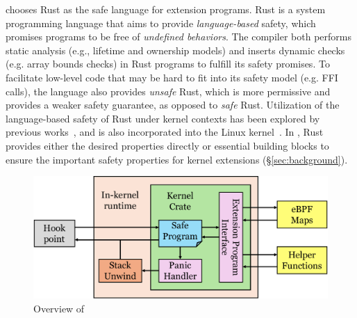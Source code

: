 
\projname{} chooses Rust as the safe language for extension programs.
Rust is a system programming language that aims to provide
    \emph{language-based} safety, which promises programs to be free of
    \emph{undefined behaviors}.
The compiler both performs static analysis (e.g., lifetime and ownership
    models) and inserts dynamic checks (e.g. array bounds checks) in
    Rust programs to fulfill its safety promises.
To facilitate low-level code that may be hard to fit into its safety model (e.g.
    FFI calls), the language also provides \emph{unsafe} Rust, which is more
    permissive and provides a weaker safety guarantee, as opposed to
    \emph{safe} Rust.
Utilization of the language-based safety of Rust under kernel contexts has been
    explored by previous works~\cite{redleaf,theseus}, and is also incorporated
    into the Linux kernel~\cite{rust-for-linux-lwn}.
In \projname{}, Rust provides either the desired properties directly or
    essential building blocks to ensure the important safety properties for
    kernel extensions (\S\ref{sec:background}).

\begin{figure}
    \includegraphics[width=1.0\linewidth]{figs/overview.pdf}
    \centering
    \vspace{-10pt}
    \caption{Overview of \projname{}}
    \label{fig:rex-overview}
    \vspace{-10pt}
\end{figure}

